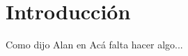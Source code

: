 \documentclass[main.tex]{subfiles}
\begin{document}
	\onlyinsubfile{
		\tableofcontents
		\listoftodos[Notes]
	}

\chapter{Introducción}

Como dijo Alan en \cite{turing1936a} 
\lipsum[1-2]
 Acá falta hacer algo...
\lipsum[2-5]

\onlyinsubfile{
	
	
}
\end{document}
